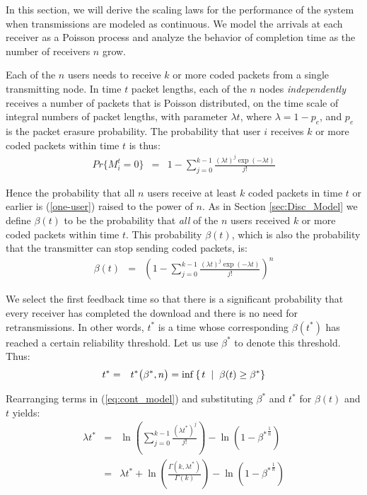 In this section, we will derive the scaling laws for the performance of the system when transmissions are modeled as continuous. We model the arrivals at each receiver as a Poisson process and analyze the behavior of completion time as the number of receivers $n$ grow.

Each of the $n$ users needs to receive $k$ or more coded packets from a single transmitting node. In time $t$ packet lengths, each of the $n$ nodes \textit{independently} receives a number of packets that is Poisson distributed, on the time scale of integral numbers of packet lengths, with parameter $\lambda t$, where $\lambda = 1 - p_e$, and $p_e$ is the packet erasure probability. The probability that user $i$ receives $k$ or more coded packets within time $t$ is thus:
\begin{eqnarray}
Pr\{M_{i}^{t} = 0\} & = & 1 - \sum_{j = 0}^{k-1} \frac{(\lambda t)^j \exp(-\lambda t)}{j!} \label{one-user}
\end{eqnarray}

Hence the probability that all $n$ users receive at least $k$ coded packets in time $t$ or earlier is (\ref{one-user}) raised to the power of $n$. As in Section \ref{sec:Disc_Model} we define $\beta(t)$ to be the probability that \textit{all} of the $n$ users received $k$ or more coded packets within time $t$. This probability $\beta(t)$, which is also the probability that the transmitter can stop sending coded packets, is:
\begin{eqnarray}
\beta(t) & = & \left(1 - \sum_{j = 0}^{k-1} \frac{(\lambda t)^{j} \exp(-\lambda t)}{j!} \right)^{n} \label{eq:cont_model}
\end{eqnarray}

We select the first feedback time so that there is a significant probability that every receiver has completed the download and there is no need for retransmissions. In other words, $t^{*}$ is a time whose corresponding $\beta(t^*)$ has reached a certain reliability threshold. Let us use $\beta^{*}$ to denote this threshold. Thus: 
\begin{eqnarray}
t^{*} & = & t^{*}\big(\beta^{*},n\big) = \inf \left \{\hspace{0.05cm} t \hspace{0.2cm} | \hspace{0.2cm} \beta(t) \geq \beta^{*} \right \}
\end{eqnarray}

Rearranging terms in (\ref{eq:cont_model}) and substituting $\beta^{*}$ and $t^{*}$ for $\beta(t)$ and $t$ yields:
\begin{eqnarray}
\lambda t^{*} & = & \ln \left (\sum_{j = 0}^{k-1} \frac{(\lambda t^{*})^j}{j!}\right) - \ln \left( 1 - {\beta^{*}}^\frac{1}{n} \right) \label{exact-expression} \\
& = & \lambda t^{*} + \ln \left(\frac{\Gamma(k,\lambda t^{*})}{\Gamma(k)}\right) - \ln \left( 1 - {\beta^{*}}^\frac{1}{n} \right)
\end{eqnarray}

